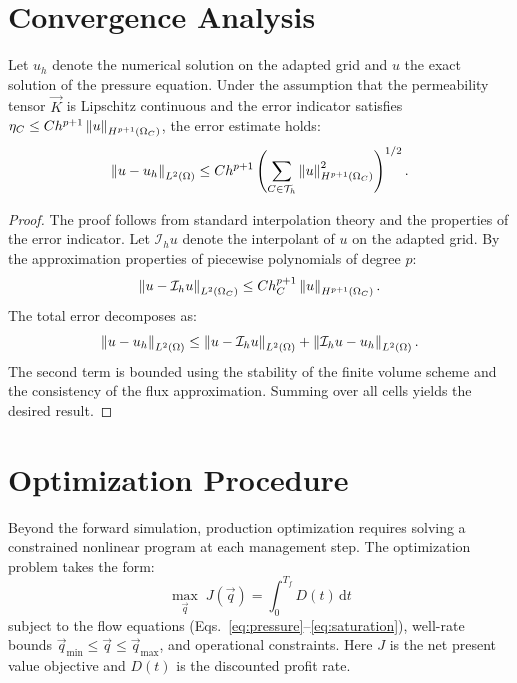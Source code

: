 \section{Convergence Analysis}
\label{sec:methodology:convergence}

\begin{theorem}
\label{thm:convergence}
Let $u_h$ denote the numerical solution on the adapted grid and $u$ the exact solution of the pressure equation. Under the assumption that the permeability tensor $\vec{K}$ is Lipschitz continuous and the error indicator satisfies $\eta_C \leq C h^{p+1} \left\| u \right\|_{H^{p+1}(\Omega_C)}$, the error estimate holds:
\begin{equation}
    \left\| u - u_h \right\|_{L^2(\Omega)} \leq C h^{p+1} \left( \sum_{C \in \mathcal{T}_h} \left\| u \right\|_{H^{p+1}(\Omega_C)}^2 \right)^{1/2}.
    \label{eq:convergence}
\end{equation}
\end{theorem}

\begin{proof}
The proof follows from standard interpolation theory and the properties of the error indicator. Let $\mathcal{I}_h u$ denote the interpolant of $u$ on the adapted grid. By the approximation properties of piecewise polynomials of degree $p$:
\begin{equation}
    \left\| u - \mathcal{I}_h u \right\|_{L^2(\Omega_C)} \leq C h_C^{p+1} \left\| u \right\|_{H^{p+1}(\Omega_C)}.
    \label{eq:interp}
\end{equation}
The total error decomposes as:
\begin{equation}
    \left\| u - u_h \right\|_{L^2(\Omega)} \leq \left\| u - \mathcal{I}_h u \right\|_{L^2(\Omega)} + \left\| \mathcal{I}_h u - u_h \right\|_{L^2(\Omega)}.
    \label{eq:decompose}
\end{equation}
The second term is bounded using the stability of the finite volume scheme and the consistency of the flux approximation. Summing over all cells yields the desired result.
\end{proof}

\section{Optimization Procedure}
\label{sec:methodology:optimization}

Beyond the forward simulation, production optimization requires solving a constrained nonlinear program at each management step. The optimization problem takes the form:
\begin{equation}
    \max_{\vec{q}} \; J(\vec{q}) = \int_0^{T_f} D(t) \, \mathrm{d}t
    \label{eq:optimization}
\end{equation}
subject to the flow equations (Eqs.~\eqref{eq:pressure}--\eqref{eq:saturation}), well-rate bounds $\vec{q}_{\min} \leq \vec{q} \leq \vec{q}_{\max}$, and operational constraints. Here $J$ is the net present value objective and $D(t)$ is the discounted profit rate.

